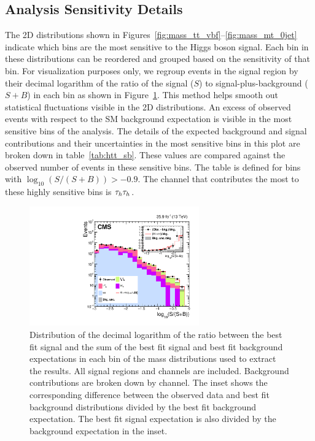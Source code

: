 \subsection{Analysis Sensitivity Details}
The 2D distributions shown in Figures~\ref{fig:mass_tt_vbf}--\ref{fig:mass_mt_0jet}
indicate which bins are the most sensitive to the Higgs boson signal. Each bin in these distributions
can be reordered and grouped based on the sensitivity of that bin. For visualization purposes only, we regroup 
events in the signal region by their decimal logarithm of the ratio of the signal ($S$) to 
signal-plus-background ($S+B$) in each bin as shown in Figure~\ref{fig:htt_sb}. This method helps smooth out statistical
fluctuations visible in the 2D distributions. An excess of observed events with respect to the 
SM background expectation is visible in the most sensitive bins of the analysis.
The details of the expected background and signal contributions and their uncertainties in the most sensitive bins in 
this plot are broken down in table~\ref{tab:htt_sb}. 
These values are compared against the observed number of events in these sensitive bins. 
The table is defined for bins with $\log_{10}(S/(S+B))>-0.9$. The channel that contributes the 
most to these highly sensitive bins is $\tau_{h}\tau_{h}$.

\begin{figure}[htb]
  \centering
    \includegraphics[width=0.65\textwidth]{higgs_to_taus/plots/Figure_018.pdf}
   \caption{Distribution of the decimal logarithm of the ratio between the best fit signal and the sum of 
the best fit signal and best fit background expectations in each bin of the mass distributions used to extract the results.
All signal regions and channels are included. Background contributions are broken down by channel. 
The inset shows the corresponding difference between the observed data and best fit background 
distributions divided by the best fit background expectation. The best fit signal expectation 
is also divided by the background expectation in the inset.
   }
\label{fig:htt_sb}

\end{figure}


